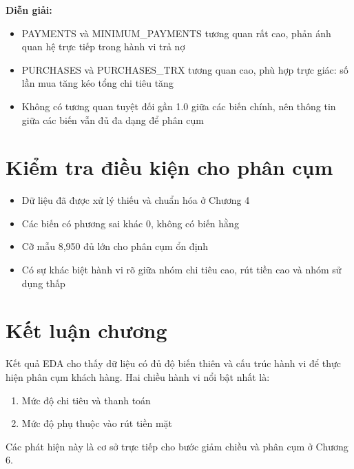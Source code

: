 \textbf{Diễn giải:}
\begin{itemize}
    \item PAYMENTS và MINIMUM\_PAYMENTS tương quan rất cao, phản ánh quan hệ trực tiếp trong hành vi trả nợ
    \item PURCHASES và PURCHASES\_TRX tương quan cao, phù hợp trực giác: số lần mua tăng kéo tổng chi tiêu tăng
    \item Không có tương quan tuyệt đối gần 1.0 giữa các biến chính, nên thông tin giữa các biến vẫn đủ đa dạng để phân cụm
\end{itemize}

\section{Kiểm tra điều kiện cho phân cụm}

\begin{itemize}
    \item Dữ liệu đã được xử lý thiếu và chuẩn hóa ở Chương 4
    \item Các biến có phương sai khác 0, không có biến hằng
    \item Cỡ mẫu 8,950 đủ lớn cho phân cụm ổn định
    \item Có sự khác biệt hành vi rõ giữa nhóm chi tiêu cao, rút tiền cao và nhóm sử dụng thấp
\end{itemize}

\section{Kết luận chương}

Kết quả EDA cho thấy dữ liệu có đủ độ biến thiên và cấu trúc hành vi để thực hiện phân cụm khách hàng. Hai chiều hành vi nổi bật nhất là:
\begin{enumerate}
    \item Mức độ chi tiêu và thanh toán
    \item Mức độ phụ thuộc vào rút tiền mặt
\end{enumerate}

Các phát hiện này là cơ sở trực tiếp cho bước giảm chiều và phân cụm ở Chương 6.
